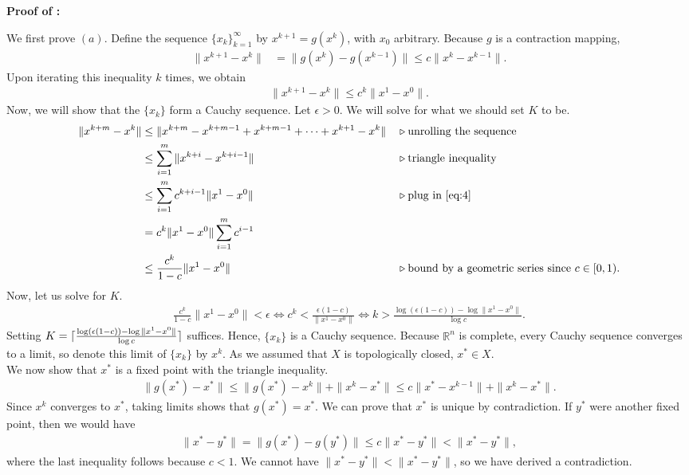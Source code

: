 \documentclass{article}
\DeclarePairedDelimiter{\ceil}{\lceil}{\rceil}
\begin{document}
\textbf{Proof of :} 

We first prove $(a)$. Define the sequence $\{x_k\}_{k = 1}^\infty$ by $x^{k+1} = g(x^k)$, with $x_0$ arbitrary. Because $g$ is a contraction mapping,
\begin{align}
    \|x^{k+1} - x^k\| &= \|g(x^k)-g(x^{k-1})\| \leq c \|x^{k} - x^{k - 1}\|.
\end{align}
Upon iterating this inequality $k$ times, we obtain
\begin{align}\label{eq:4} 
    \|x^{k+1} - x^k\| \leq c^k\|x^1-x^0\|.
\end{align}
Now, we will show that the $\{x_k\}$ form a Cauchy sequence. Let $\epsilon > 0$. We will solve for what we should set $K$ to be. 
\begin{align*}
    \|x^{k+m} - x^k\| &\leq  \|x^{k + m} - x^{k + m - 1} + x^{k + m - 1} + \cdots + x^{k + 1} - x^k\| &&\triangleright \text{unrolling the sequence}\\
    &\leq \sum_{i=1}^m   \|x^{k+i} - x^{k+i-1}\| && \triangleright \text{triangle inequality}\\
    &\leq \sum_{i = 1}^m c^{k + i - 1}\|x^1-x^0\| && \triangleright\text{plug in \Cref{eq:4}}\\
    &= c^k \|x^1 - x^0\|\sum_{i = 1}^m c^{ i - 1}\\
    &\leq \frac{c^k}{1-c}\|x^1-x^0\| && \triangleright \text{bound by a geometric series since } c \in [0, 1).
\end{align*}
Now, let us solve for $K$.
\begin{align*}
    \frac{c^k}{1-c}\|x^1-x^0\| < \epsilon \iff c^k < \frac{\epsilon(1 - c)}{\|x^1 - x^0\|} \iff k > \frac{\log(\epsilon (1 - c)) - \log \|x^1 - x^0\| }{\log c}.
\end{align*}
Setting $K = \ceil{\frac{\log(\epsilon (1 - c)) - \log \|x^1 - x^0\| }{\log c}}$ suffices. Hence, $\{x_k\}$ is a Cauchy sequence. Because $\mathbb{R}^n$ is complete, every Cauchy sequence converges to a limit, so denote this limit of $\{x_k\}$ by $x^k$. As we assumed that $X$ is topologically closed, $x^* \in X$.\\ 

We now show that $x^*$ is a fixed point with the triangle inequality.
\begin{align*}
    \|g(x^*)-x^*\| \leq \|g(x^*)-x^k\|+\|x^k-x^*\| \leq c\|x^*-x^{k-1}\|+\|x^k-x^*\|.
\end{align*}
Since $x^k$ converges to $x^*$, taking limits shows that $g(x^*) = x^*$. We can prove that $x^*$ is unique by contradiction. If $y^*$ were another fixed point, then we would have
\begin{align*}
    \|x^*-y^*\|=\|g(x^*)-g(y^*)\| \leq c\|x^*-y^*\| < \|x^* - y^*\|,
\end{align*}
where the last inequality follows because $c < 1$. We cannot have $\|x^* - y^*\| < \|x^* - y^*\|$, so we have derived a contradiction. \\
\end{document}
